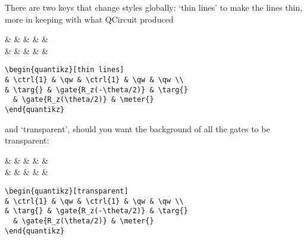 \documentclass[aps,pra,10pt,nofootinbib]{revtex4}
\begin{document}
There are two keys that change styles globally: `thin lines' to make the lines thin, more in keeping with what QCircuit produced
\begin{Code}
\begin{center}
\begin{quantikz}
&  & \qw &  & \qw & \qw \\
& \targ{} &  & \targ{} &  & \meter{}
\end{quantikz}
\end{center}
\tcblower
\begin{lstlisting}
\begin{quantikz}[thin lines]
& \ctrl{1} & \qw & \ctrl{1} & \qw & \qw \\
& \targ{} & \gate{R_z(-\theta/2)} & \targ{} 
  & \gate{R_z(\theta/2)} & \meter{}
\end{quantikz}
\end{lstlisting}
\end{Code}
\noindent and `transparent', should you want the background of all the gates to be transparent:
\begin{Code}
\begin{center}
\begin{quantikz}[transparent]
&  & \qw &  & \qw & \qw \\
& \targ{} &  & \targ{} &  & \meter{}
\end{quantikz}
\end{center}
\tcblower
\begin{lstlisting}
\begin{quantikz}[transparent]
& \ctrl{1} & \qw & \ctrl{1} & \qw & \qw \\
& \targ{} & \gate{R_z(-\theta/2)} & \targ{} 
  & \gate{R_z(\theta/2)} & \meter{}
\end{quantikz}
\end{lstlisting}
\end{Code}
\end{document}
